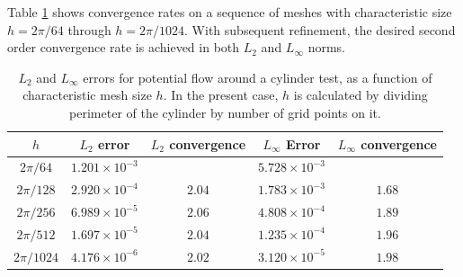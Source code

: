 \documentclass[final,3p,review]{elsarticle}
\begin{document}
  	
  	\noindent Table \ref{tab:potential_flow}  shows convergence rates on a sequence of meshes with characteristic size $h = 2\pi/64$ through $h = 2\pi/1024$. With subsequent refinement, the desired second order convergence rate is achieved in both $L_2$ and $L_{\infty}$ norms. 
  	\begin{table}[h]
  		\centering
  		\begin{tabular}{|c|c|c|c|c|}
  			\hline
  			$h$& $L_2$ error & $L_2$ convergence & $L_\infty$ Error & $L_\infty$ convergence \\
  			\hline
  			$2\pi/64$& $1.201 \times 10^{-3}$  &  & $5.728 \times 10^{-3}$ &  \\
  			\hline
  			$2\pi/128$& $2.920 \times 10^{-4}$  & $2.04$ & $1.783 \times 10^{-3}$ & $1.68$   \\
  			\hline
  			$2\pi/256$& $6.989 \times 10^{-5}$ & $2.06$  & $4.808 \times 10^{-4}$ & $1.89$  \\
  			\hline
  			$2\pi/512$& $1.697 \times 10^{-5}$  & $2.04$ & $1.235 \times 10^{-4}$  & $1.96$ \\
  			\hline
  			$2\pi/1024$& $4.176 \times 10^{-6}$  & $2.02$ & $3.120 \times 10^{-5}$  & $1.98$ \\
  			\hline
  		\end{tabular}
  		\caption {$L_2$ and $L_{\infty}$ errors for potential flow  around a cylinder test, as a function of characteristic mesh size $h$. In the present case, $h$ is calculated by dividing perimeter of the cylinder by number of grid points on it.}
  		\label{tab:potential_flow}
  	\end{table} 
  	
\end{document}
